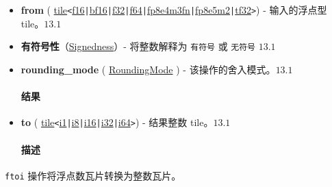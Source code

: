\documentclass{article}
\begin{document}
\begin{itemize}
\item \textbf{from} ( \href{https://docs.nvidia.com/cuda/tile-ir/latest/sections/types.html#type-tile}{tile}\texttt{<}\href{https://docs.nvidia.com/cuda/tile-ir/latest/sections/types.html#subsection-element-types}{f16}\texttt{|}\href{https://docs.nvidia.com/cuda/tile-ir/latest/sections/types.html#subsection-element-types}{bf16}\texttt{|}\href{https://docs.nvidia.com/cuda/tile-ir/latest/sections/types.html#subsection-element-types}{f32}\texttt{|}\href{https://docs.nvidia.com/cuda/tile-ir/latest/sections/types.html#subsection-element-types}{f64}\texttt{|}\href{https://docs.nvidia.com/cuda/tile-ir/latest/sections/types.html#subsection-element-types}{fp8e4m3fn}\texttt{|}\href{https://docs.nvidia.com/cuda/tile-ir/latest/sections/types.html#subsection-element-types}{fp8e5m2}\texttt{|}\href{https://docs.nvidia.com/cuda/tile-ir/latest/sections/types.html#subsection-element-types}{tf32}\texttt{>}) - 输入的浮点型 tile。$\boxed{13.1}$
\item \textbf{有符号性}（\href{https://docs.nvidia.com/cuda/tile-ir/latest/sections/operations.html#op-attribute-cuda-tile-ftoi-signedness-attr}{Signedness}）- 将整数解释为 \texttt{有符号} 或 \texttt{无符号} $\boxed{13.1}$
\item \textbf{rounding\_mode} ( \href{https://docs.nvidia.com/cuda/tile-ir/latest/sections/operations.html#op-attribute-cuda-tile-ftoi-roundingmode-attr}{RoundingMode} ) - 该操作的舍入模式。$\boxed{13.1}$


\paragraph{结果}

\item \textbf{to} ( \href{https://docs.nvidia.com/cuda/tile-ir/latest/sections/types.html#type-tile}{tile}\texttt{<}\href{https://docs.nvidia.com/cuda/tile-ir/latest/sections/types.html#subsection-element-types}{i1}\texttt{|}\href{https://docs.nvidia.com/cuda/tile-ir/latest/sections/types.html#subsection-element-types}{i8}\texttt{|}\href{https://docs.nvidia.com/cuda/tile-ir/latest/sections/types.html#subsection-element-types}{i16}\texttt{|}\href{https://docs.nvidia.com/cuda/tile-ir/latest/sections/types.html#subsection-element-types}{i32}\texttt{|}\href{https://docs.nvidia.com/cuda/tile-ir/latest/sections/types.html#subsection-element-types}{i64}\texttt{>}) - 结果整数 tile。$\boxed{13.1}$


\paragraph{描述}

\end{itemize}
\texttt{ftoi} 操作将浮点数瓦片转换为整数瓦片。
\end{document}
